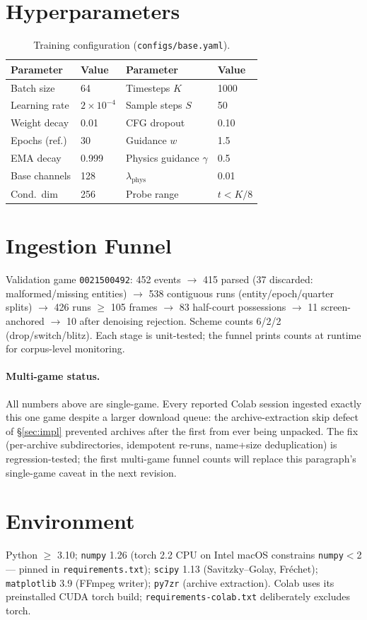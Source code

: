 \documentclass[11pt]{article}
\begin{document}
\section{Hyperparameters}
\label{app:hparams}
\begin{table}[h]
\centering
\caption{Training configuration (\texttt{configs/base.yaml}).}
\begin{tabular}{llll}
\toprule
Parameter & Value & Parameter & Value \\
\midrule
Batch size & 64 & Timesteps $K$ & 1000 \\
Learning rate & $2{\times}10^{-4}$ & Sample steps $S$ & 50 \\
Weight decay & 0.01 & CFG dropout & 0.10 \\
Epochs (ref.) & 30 & Guidance $w$ & 1.5 \\
EMA decay & 0.999 & Physics guidance $\gamma$ & 0.5 \\
Base channels & 128 & $\lambda_{\text{phys}}$ & 0.01 \\
Cond.\ dim & 256 & Probe range & $t < K/8$ \\
\bottomrule
\end{tabular}
\end{table}

\section{Ingestion Funnel}
\label{app:funnel}
Validation game \texttt{0021500492}: 452 events $\rightarrow$ 415 parsed
(37 discarded: malformed/missing entities) $\rightarrow$ 538 contiguous runs
(entity/epoch/quarter splits) $\rightarrow$ 426 runs $\ge$ 105 frames
$\rightarrow$ 83 half-court possessions $\rightarrow$ 11 screen-anchored
$\rightarrow$ 10 after denoising rejection. Scheme counts 6/2/2
(drop/switch/blitz). Each stage is unit-tested; the funnel prints counts at
runtime for corpus-level monitoring.

\paragraph{Multi-game status.} All numbers above are single-game. Every
reported Colab session ingested exactly this one game despite a larger
download queue: the archive-extraction skip defect of \S\ref{sec:impl}
prevented archives after the first from ever being unpacked. The fix
(per-archive subdirectories, idempotent re-runs, name+size deduplication) is
regression-tested; the first multi-game funnel counts will replace this
paragraph's single-game caveat in the next revision.

\section{Environment}
\label{app:env}
Python $\ge$ 3.10; \texttt{numpy} 1.26 (torch 2.2 CPU on Intel macOS
constrains \texttt{numpy}$<$2 --- pinned in \texttt{requirements.txt});
\texttt{scipy} 1.13 (Savitzky--Golay, Fr\'echet); \texttt{matplotlib} 3.9
(FFmpeg writer); \texttt{py7zr} (archive extraction). Colab uses its
preinstalled CUDA torch build; \texttt{requirements-colab.txt} deliberately
excludes torch.
\end{document}

